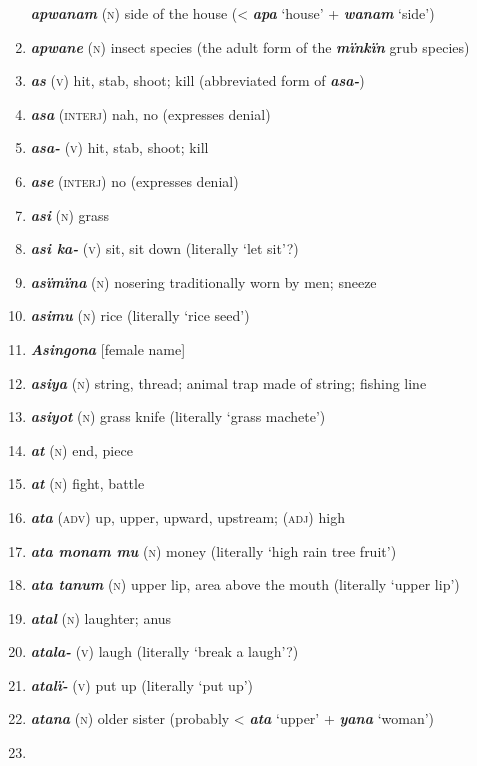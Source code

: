 \begin{enumerate}[noitemsep, label={}, align=left, widest=190, labelsep=1ex,leftmargin=*,itemindent=-10pt]
\textbf{\textit{apwanam}} (\textsc{n}) side of the house (< \textbf{\textit{apa}} ‘house’ + \textbf{\textit{wanam}} ‘side’) \item 
\textbf{\textit{apwane}} (\textsc{n}) insect species (the adult form of the \textbf{\textit{mïnkïn}} grub species) \item 
\textbf{\textit{as}} (\textsc{v}) hit, stab, shoot; kill (abbreviated form of \textbf{\textit{asa-}}) \item 
\textbf{\textit{asa}} (\textsc{interj}) nah, no (expresses denial) \item 
\textbf{\textit{asa-}} (\textsc{v}) hit, stab, shoot; kill \item 
\textbf{\textit{ase}} (\textsc{interj}) no (expresses denial) \item 
\textbf{\textit{asi}} (\textsc{n}) grass \item 
\textbf{\textit{asi ka-}} (\textsc{v}) sit, sit down (literally ‘let sit’?) \item 
\textbf{\textit{asïmïna}} (\textsc{n}) nosering traditionally worn by men; sneeze \item 
\textbf{\textit{asimu}} (\textsc{n}) rice (literally ‘rice seed’) \item 
\textbf{\textit{Asingona}} [female name] \item 
\textbf{\textit{asiya}} (\textsc{n}) string, thread; animal trap made of string; fishing line \item 
\textbf{\textit{asiyot}} (\textsc{n}) grass knife (literally ‘grass machete’) \item 
\textbf{\textit{at}} (\textsc{n}) end, piece \item 
\textbf{\textit{at}} (\textsc{n}) fight, battle \item 
\textbf{\textit{ata}} (\textsc{adv}) up, upper, upward, upstream; (\textsc{adj)} high \item 
\textbf{\textit{ata monam mu}} (\textsc{n}) money (literally ‘high rain tree fruit’) \item 
\textbf{\textit{ata tanum}} (\textsc{n}) upper lip, area above the mouth (literally ‘upper lip’) \item 
\textbf{\textit{atal}} (\textsc{n}) laughter; anus \item 
\textbf{\textit{atala-}} (\textsc{v}) laugh (literally ‘break a laugh’?) \item 
\textbf{\textit{atalï-}} (\textsc{v}) put up (literally ‘put up’) \item 
\textbf{\textit{atana}} (\textsc{n}) older sister (probably < \textbf{\textit{ata}} ‘upper’ + \textbf{\textit{yana}} ‘woman’) \item 

\end{enumerate}
